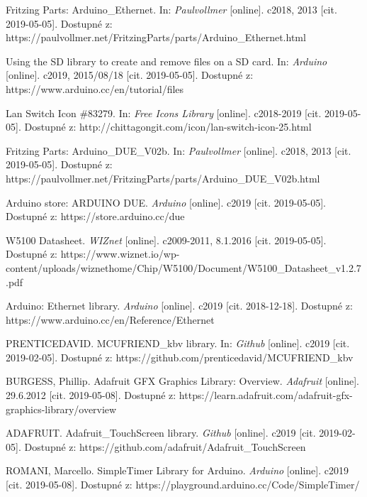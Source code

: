 \renewcommand{\refname}{Reference}
\begin{thebibliography}{20}

Fritzing Parts: Arduino\_Ethernet. In: \textit{Paulvollmer} [online]. c2018, 2013 [cit. 2019-05-05]. Dostupné z: https://paulvollmer.net/FritzingParts/parts/Arduino\_Ethernet.html

Using the SD library to create and remove files on a SD card. In: \textit{Arduino} [online]. c2019, 2015/08/18 [cit. 2019-05-05]. Dostupné z: https://www.arduino.cc/en/tutorial/files

Lan Switch Icon \#83279. In: \textit{Free Icons Library} [online]. c2018-2019 [cit. 2019-05-05]. Dostupné z: http://chittagongit.com/icon/lan-switch-icon-25.html

Fritzing Parts: Arduino\_DUE\_V02b. In: \textit{Paulvollmer} [online]. c2018, 2013 [cit. 2019-05-05]. Dostupné z: https://paulvollmer.net/FritzingParts/parts/Arduino\_DUE\_V02b.html

Arduino store: ARDUINO DUE. \textit{Arduino} [online]. c2019 [cit. 2019-05-05]. Dostupné z: https://store.arduino.cc/due

W5100 Datasheet. \textit{WIZnet} [online]. c2009-2011, 8.1.2016 [cit. 2019-05-05]. Dostupné z: https://www.wiznet.io/wp-content/uploads/wiznethome/Chip/W5100/Document/W5100\_Datasheet\_v1.2.7.pdf

Arduino: Ethernet library. \textit{Arduino} [online]. c2019 [cit. 2018-12-18]. Dostupné z: https://www.arduino.cc/en/Reference/Ethernet

PRENTICEDAVID. MCUFRIEND\_kbv library. In: \textit{Github} [online]. c2019 [cit. 2019-02-05]. Dostupné z: https://github.com/prenticedavid/MCUFRIEND\_kbv

BURGESS, Phillip. Adafruit GFX Graphics Library: Overview. \textit{Adafruit} [online]. 29.6.2012 [cit. 2019-05-08]. Dostupné z: https://learn.adafruit.com/adafruit-gfx-graphics-library/overview

ADAFRUIT. Adafruit\_TouchScreen library. \textit{Github} [online]. c2019 [cit. 2019-02-05]. Dostupné z: https://github.com/adafruit/Adafruit\_TouchScreen

ROMANI, Marcello. SimpleTimer Library for Arduino. \textit{Arduino} [online]. c2019 [cit. 2019-05-08]. Dostupné z: https://playground.arduino.cc/Code/SimpleTimer/


\end{thebibliography}
